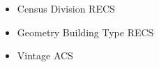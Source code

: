 \begin{itemize}
\item Census Division RECS
\item Geometry Building Type RECS
\item Vintage ACS
\end{itemize}
